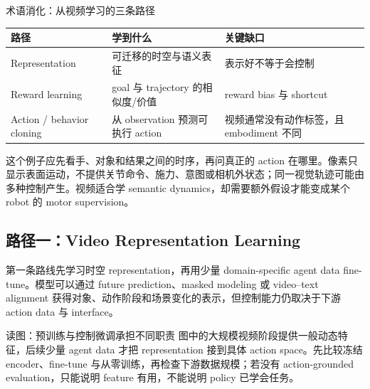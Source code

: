 
\begin{knowledgebox}{术语消化：从视频学习的三条路径}
\begin{tabularx}{\textwidth}{@{}L{0.19\textwidth}X X@{}}
\toprule
路径 & 学到什么 & 关键缺口 \\
\midrule
Representation & 可迁移的时空与语义表征 & 表示好不等于会控制 \\
Reward learning & goal 与 trajectory 的相似度/价值 & reward bias 与 shortcut \\
Action / behavior cloning & 从 observation 预测可执行 action & 视频通常没有动作标签，且 embodiment 不同 \\
\bottomrule
\end{tabularx}
\end{knowledgebox}


这个例子应先看手、对象和结果之间的时序，再问真正的 action 在哪里。像素只显示表面运动，不提供关节命令、施力、意图或相机外状态；同一视觉轨迹可能由多种控制产生。视频适合学 semantic dynamics，却需要额外假设才能变成某个 robot 的 motor supervision。


\subsection{路径一：Video Representation Learning}

第一条路线先学习时空 representation，再用少量 domain-specific agent data fine-tune。模型可以通过 future prediction、masked modeling 或 video--text alignment 获得对象、动作阶段和场景变化的表示，但控制能力仍取决于下游 action data 与 interface。


\begin{knowledgebox}{读图：预训练与控制微调承担不同职责}
图中的大规模视频阶段提供一般动态特征，后续少量 agent data 才把 representation 接到具体 action space。先比较冻结 encoder、fine-tune 与从零训练，再检查下游数据规模；若没有 action-grounded evaluation，只能说明 feature 有用，不能说明 policy 已学会任务。
\end{knowledgebox}

